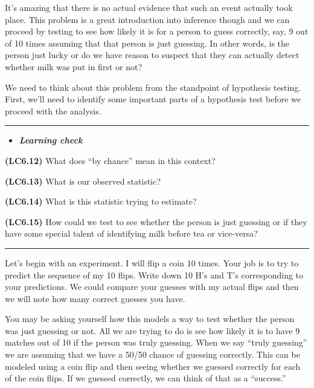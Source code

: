 \documentclass[]{tufte-book}
\let\oldrule=\rule
\renewcommand{\rule}[1]{\oldrule{\linewidth}}
\newenvironment{rmdblock}[1]
  {\begin{shaded*}
  \begin{itemize}
  \renewcommand{\labelitemi}{
    \raisebox{-.7\height}[0pt][0pt]{
    }
  }
  \item
  }
  {
  \end{itemize}
  \end{shaded*}
  }
\newenvironment{learncheck}
  {\begin{rmdblock}{warning}}
  {\end{rmdblock}}
\begin{document}
It's amazing that there is no actual evidence that such an event
actually took place. This problem is a great introduction into inference
though and we can proceed by testing to see how likely it is for a
person to guess correctly, say, 9 out of 10 times assuming that that
person is just guessing. In other words, is the person just lucky or do
we have reason to suspect that they can actually detect whether milk was
put in first or not?

We need to think about this problem from the standpoint of hypothesis
testing. First, we'll need to identify some important parts of a
hypothesis test before we proceed with the analysis.

\begin{center}\rule{0.5\linewidth}{\linethickness}\end{center}

\begin{learncheck}
\textbf{\emph{Learning check}}
\end{learncheck}

\textbf{(LC6.12)} What does ``by chance'' mean in this context?

\textbf{(LC6.13)} What is our observed statistic?

\textbf{(LC6.14)} What is this statistic trying to estimate?

\textbf{(LC6.15)} How could we test to see whether the person is just
guessing or if they have some special talent of identifying milk before
tea or vice-versa?

\begin{center}\rule{0.5\linewidth}{\linethickness}\end{center}

Let's begin with an experiment. I will flip a coin 10 times. Your job is
to try to predict the sequence of my 10 flips. Write down 10 H's and T's
corresponding to your predictions. We could compare your guesses with my
actual flips and then we will note how many correct guesses you have.

You may be asking yourself how this models a way to test whether the
person was just guessing or not. All we are trying to do is see how
likely it is to have 9 matches out of 10 if the person was truly
guessing. When we say ``truly guessing'' we are assuming that we have a
50/50 chance of guessing correctly. This can be modeled using a coin
flip and then seeing whether we guessed correctly for each of the coin
flips. If we guessed correctly, we can think of that as a ``success.''
\end{document}
